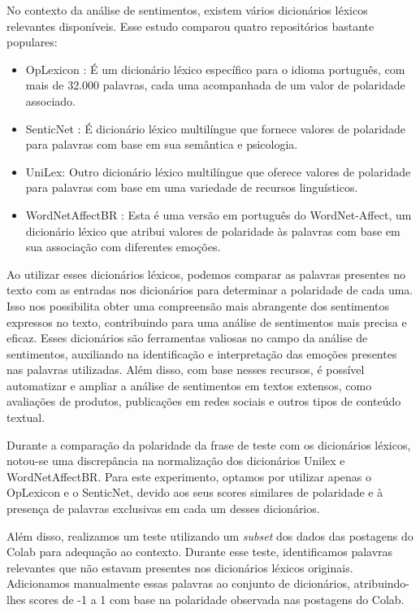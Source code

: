 No contexto da análise de sentimentos, existem vários dicionários léxicos relevantes disponíveis. Esse estudo comparou quatro repositórios bastante populares:

\begin{itemize}
	\item OpLexicon \cite{2011_Souza_IP}: É um dicionário léxico específico para o idioma português, com mais de 32.000 palavras, cada uma acompanhada de um valor de polaridade associado.
	\item SenticNet \cite{2016_Cambria_IP}: É dicionário léxico multilíngue que fornece valores de polaridade para palavras com base em sua semântica e psicologia.
	\item UniLex: Outro dicionário léxico multilíngue que oferece valores de polaridade para palavras com base em uma variedade de recursos linguísticos.
	\item WordNetAffectBR \cite{2008_Pasqualotti}: Esta é uma versão em português do WordNet-Affect, um dicionário léxico que atribui valores de polaridade às palavras com base em sua associação com diferentes emoções.
\end{itemize}

Ao utilizar esses dicionários léxicos, podemos comparar as palavras presentes no texto com as entradas nos dicionários para determinar a polaridade de cada uma. Isso nos possibilita obter uma compreensão mais abrangente dos sentimentos expressos no texto, contribuindo para uma análise de sentimentos mais precisa e eficaz. Esses dicionários são ferramentas valiosas no campo da análise de sentimentos, auxiliando na identificação e interpretação das emoções presentes nas palavras utilizadas. Além disso, com base nesses recursos, é possível automatizar e ampliar a análise de sentimentos em textos extensos, como avaliações de produtos, publicações em redes sociais e outros tipos de conteúdo textual.

Durante a comparação da polaridade da frase de teste com os dicionários léxicos, notou-se uma discrepância na normalização dos dicionários Unilex e WordNetAffectBR. Para este experimento, optamos por utilizar apenas o OpLexicon e o SenticNet, devido aos seus scores similares de polaridade e à presença de palavras exclusivas em cada um desses dicionários.

Além disso, realizamos um teste utilizando um \textit{subset} dos dados das postagens do Colab para adequação ao contexto. Durante esse teste, identificamos palavras relevantes que não estavam presentes nos dicionários léxicos originais. Adicionamos manualmente essas palavras ao conjunto de dicionários, atribuindo-lhes scores de -1 a 1 com base na polaridade observada nas postagens do Colab.


